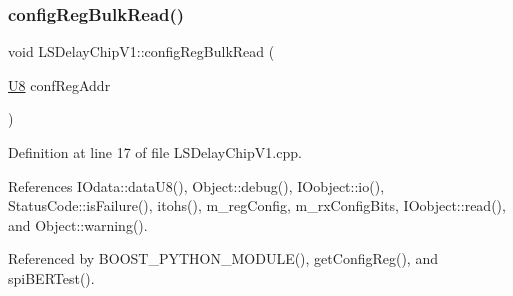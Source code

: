 \subsubsection{\texorpdfstring{config\+Reg\+Bulk\+Read()}{configRegBulkRead()}}
{\footnotesize\ttfamily void L\+S\+Delay\+Chip\+V1\+::config\+Reg\+Bulk\+Read (\begin{DoxyParamCaption}\item[{\hyperlink{ICECALv3_8h_a3cb25ca6f51f003950f9625ff05536fc}{U8}}]{conf\+Reg\+Addr }\end{DoxyParamCaption})}



Definition at line 17 of file L\+S\+Delay\+Chip\+V1.\+cpp.



References I\+Odata\+::data\+U8(), Object\+::debug(), I\+Oobject\+::io(), Status\+Code\+::is\+Failure(), itohs(), m\+\_\+reg\+Config, m\+\_\+rx\+Config\+Bits, I\+Oobject\+::read(), and Object\+::warning().



Referenced by B\+O\+O\+S\+T\+\_\+\+P\+Y\+T\+H\+O\+N\+\_\+\+M\+O\+D\+U\+L\+E(), get\+Config\+Reg(), and spi\+B\+E\+R\+Test().


